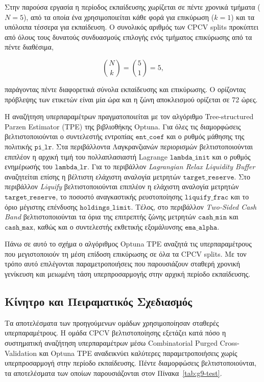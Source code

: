 Στην παρούσα εργασία η περίοδος εκπαίδευσης χωρίζεται σε πέντε χρονικά
τμήματα ($N=5$), από τα οποία ένα χρησιμοποιείται κάθε φορά για
επικύρωση ($k=1$) και τα υπόλοιπα τέσσερα για εκπαίδευση. Ο συνολικός
αριθμός των CPCV splits προκύπτει από όλους τους δυνατούς συνδυασμούς
επιλογής ενός τμήματος επικύρωσης από τα πέντε διαθέσιμα,

\begin{equation}
\binom{N}{k}
=
\binom{5}{1}
=
5,
\end{equation}

παράγοντας πέντε διαφορετικά σύνολα εκπαίδευσης και επικύρωσης.
Ο ορίζοντας πρόβλεψης των ετικετών είναι μία ώρα και η ζώνη αποκλεισμού
ορίζεται σε 72 ώρες.

Η αναζήτηση υπερπαραμέτρων πραγματοποιείται με τον αλγόριθμο
Tree-structured Parzen Estimator (TPE) της βιβλιοθήκης Optuna.
Για όλες τις διαμορφώσεις βελτιστοποιούνται ο συντελεστής εντροπίας
$\texttt{ent\_coef}$ και ο ρυθμός μάθησης της πολιτικής
$\texttt{pi\_lr}$.
Στα περιβάλλοντα Λαγκρανζιανών περιορισμών βελτιστοποιούνται επιπλέον
η αρχική τιμή του πολλαπλασιαστή Lagrange $\texttt{lambda\_init}$ και ο
ρυθμός ενημέρωσής του $\texttt{lambda\_lr}$.
Για το περιβάλλον \textit{Lagrangian Relax Liquidity Buffer}
αναζητείται επίσης η βέλτιστη ελάχιστη αναλογία μετρητών
$\texttt{target\_reserve}$.
Στο περιβάλλον \textit{Liquify} βελτιστοποιούνται επιπλέον η ελάχιστη
αναλογία μετρητών $\texttt{target\_reserve}$, το ποσοστό αναγκαστικής
ρευστοποίησης $\texttt{liquify\_frac}$ και το όριο μέγιστης επένδυσης
$\texttt{holdings\_limit}$.
Τέλος, στο περιβάλλον \textit{Two-Sided Cash Band} βελτιστοποιούνται τα
όρια της επιτρεπτής ζώνης μετρητών $\texttt{cash\_min}$ και
$\texttt{cash\_max}$, καθώς και ο συντελεστής εκθετικής εξομάλυνσης
$\texttt{ema\_alpha}$.

Πάνω σε αυτό το σχήμα ο αλγόριθμος Optuna TPE αναζητά τις
υπερπαραμέτρους που μεγιστοποιούν τη μέση επίδοση επικύρωσης σε όλα τα
CPCV splits. Με τον τρόπο αυτό επιλέγονται παραμετροποιήσεις που
παρουσιάζουν σταθερή χρονική γενίκευση και μειωμένη τάση
υπερπροσαρμογής στην αρχική περίοδο εκπαίδευσης.

\subsection{Κίνητρο και Πειραματικός Σχεδιασμός}
\label{subsec:exp-cpcv-design}

Τα αποτελέσματα των προηγούμενων ομάδων χρησιμοποίησαν σταθερές υπερπαραμέτρους. Η ομάδα CPCV βελτιστοποίησης εξετάζει κατά πόσο η 
συστηματική αναζήτηση υπερπαραμέτρων μέσω Combinatorial Purged Cross-Validation \cite{lopezdeprado2018} και Optuna TPE \cite{akiba2019optuna} 
αναδεικνύει καλύτερες παραμετροποιήσεις χωρίς υπερπροσαρμογή στην περίοδο εκπαίδευσης. 
Πέντε διαμορφώσεις βελτιστοποιούνται, τα αποτελέσματα των οποίων παρουσιάζονται στον Πίνακα~\ref{tab:g9-test}.

